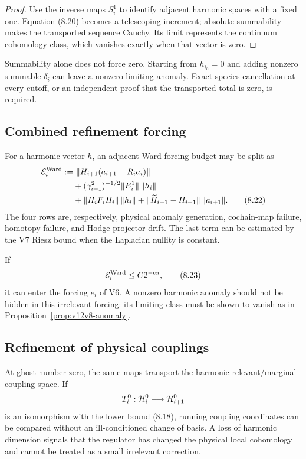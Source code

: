 \documentclass[11pt]{article}
\theoremstyle{remark}
\begin{document}
\begin{proof}
Use the inverse maps \(S_i^1\) to identify adjacent harmonic spaces
with a fixed one.  Equation (8.20) becomes a telescoping increment;
absolute summability makes the transported sequence Cauchy.  Its
limit represents the continuum cohomology class, which vanishes
exactly when that vector is zero.
\end{proof}

Summability alone does not force zero.  Starting from \(h_{i_0}=0\)
and adding nonzero summable \(\delta_i\) can leave a nonzero limiting
anomaly.  Exact species cancellation at every cutoff, or an
independent proof that the transported total is zero, is required.

\subsection{Combined refinement forcing}

For a harmonic vector \(h\), an adjacent Ward forcing budget may be
split as
\[
 \begin{split}
 {\cal E}_i^{\rm Ward}
 :=&\ \|H_{i+1}(a_{i+1}-R_ia_i)\|\\
 &+(\gamma_{i+1}^{2})^{-1/2}\|E_i^1\|\,\|h_i\|\\
 &+\|H_iF_iH_i\|\,\|h_i\|
   +\|\widetilde H_{i+1}-H_{i+1}\|\,\|a_{i+1}\|.            \tag{8.22}
 \end{split}
\]
The four rows are, respectively, physical anomaly generation,
cochain-map failure, homotopy failure, and Hodge-projector drift.
The last term can be estimated by the V7 Riesz bound when the
Laplacian nullity is constant.

If
\[
                              {\cal E}_i^{\rm Ward}
                              \le C2^{-\alpha i},             \tag{8.23}
\]
it can enter the forcing \(e_i\) of V6.  A nonzero harmonic anomaly
should not be hidden in this irrelevant forcing: its limiting class
must be shown to vanish as in
Proposition~\ref{prop:v12v8-anomaly}.

\subsection{Refinement of physical couplings}

At ghost number zero, the same maps transport the harmonic
relevant/marginal coupling space.  If
\[
                              T_i^0:{\cal H}_i^0
                              \longrightarrow{\cal H}_{i+1}^0
\]
is an isomorphism with the lower bound (8.18), running coupling
coordinates can be compared without an ill-conditioned change of
basis.  A loss of harmonic dimension signals that the regulator has
changed the physical local cohomology and cannot be treated as a
small irrelevant correction.
\end{document}

